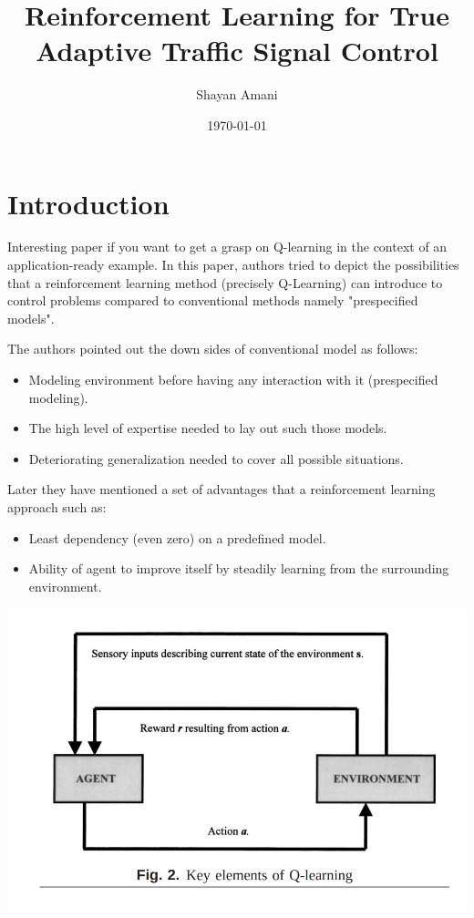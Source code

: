 \documentclass[a4paper,12pt]{article}
\title{Reinforcement Learning for True Adaptive Traffic Signal Control}
\author{Shayan Amani}
\date{\today}
\begin{document}
\maketitle

\section{Introduction}
Interesting paper if you want to get a grasp on Q-learning in the context of an application-ready example. In this paper, authors tried to depict the possibilities that a reinforcement learning method (precisely Q-Learning) can introduce to control problems compared to conventional methods namely "prespecified models".

The authors pointed out the down sides of conventional model as follows:
\begin{itemize}
    \item Modeling environment before having any interaction with it (prespecified modeling).
    \item The high level of expertise needed to lay out such those models.
    \item Deteriorating generalization needed to cover all possible situations.
\end{itemize}

Later they have mentioned a set of advantages that a reinforcement learning approach such as:
\begin{itemize}
    \item Least dependency (even zero) on a predefined model.
    \item Ability of agent to improve itself by steadily learning from the surrounding environment.
\end{itemize}

\includegraphics[width=1\columnwidth]{elements.png}





\end{document}
